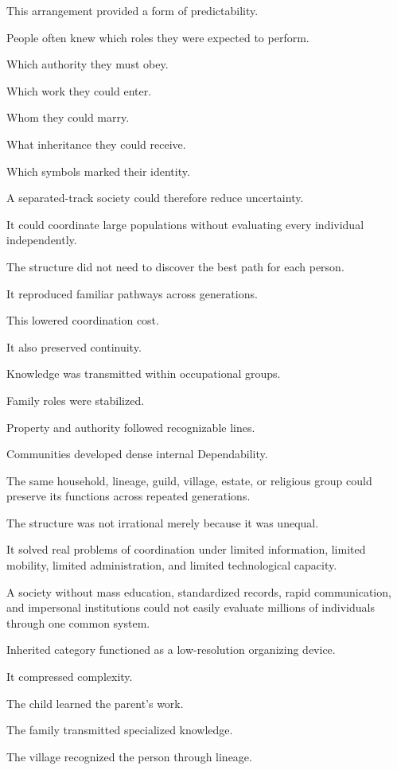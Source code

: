 This arrangement provided a form of predictability.

People often knew which roles they were expected to perform.

Which authority they must obey.

Which work they could enter.

Whom they could marry.

What inheritance they could receive.

Which symbols marked their identity.

A separated-track society could therefore reduce uncertainty.

It could coordinate large populations without evaluating every individual independently.

The structure did not need to discover the best path for each person.

It reproduced familiar pathways across generations.

This lowered coordination cost.

It also preserved continuity.

Knowledge was transmitted within occupational groups.

Family roles were stabilized.

Property and authority followed recognizable lines.

Communities developed dense internal Dependability.

The same household, lineage, guild, village, estate, or religious group could preserve its functions across repeated generations.

The structure was not irrational merely because it was unequal.

It solved real problems of coordination under limited information, limited mobility, limited administration, and limited technological capacity.

A society without mass education, standardized records, rapid communication, and impersonal institutions could not easily evaluate millions of individuals through one common system.

Inherited category functioned as a low-resolution organizing device.

It compressed complexity.

The child learned the parent’s work.

The family transmitted specialized knowledge.

The village recognized the person through lineage.

